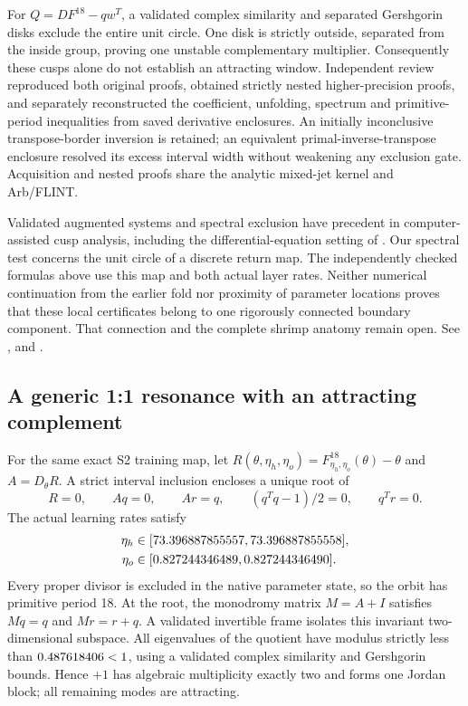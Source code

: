 \documentclass[11pt,letterpaper]{article}
\begin{document}
For $Q=DF^{18}-qw^T$, a validated complex similarity and separated Gershgorin
disks exclude the entire unit circle. One disk is strictly outside, separated
from the inside group, proving one unstable complementary multiplier.
Consequently these cusps alone do not establish an attracting window.
Independent review reproduced both original proofs, obtained strictly nested
higher-precision proofs, and separately reconstructed the coefficient,
unfolding, spectrum and primitive-period inequalities from saved derivative
enclosures. An initially inconclusive transpose-border inversion is retained;
an equivalent primal-inverse-transpose enclosure resolved its excess interval
width without weakening any exclusion gate. Acquisition and nested proofs
share the analytic mixed-jet kernel and Arb/FLINT.

Validated augmented systems and spectral exclusion have precedent in
computer-assisted cusp analysis, including the differential-equation setting
of \citet{lessardpugliese2025}. Our spectral test concerns the unit circle of
a discrete return map. The independently checked formulas above use this map
and both actual layer rates. Neither numerical continuation from the earlier
fold nor proximity of parameter locations proves that these local certificates
belong to one rigorously connected boundary component. That connection and
the complete shrimp anatomy remain open. See
,
 and
.

\subsection{A generic 1:1 resonance with an attracting complement}
\label{sec:double-one}

For the same exact S2 training map, let
$R(\theta,\eta_h,\eta_o)=F_{\eta_h,\eta_o}^{18}(\theta)-\theta$
and $A=D_\theta R$. A strict interval inclusion encloses a unique root of
\begin{equation}
R=0,\qquad Aq=0,\qquad Ar=q,\qquad
(q^Tq-1)/2=0,\qquad q^Tr=0.
\label{eq:double-one-chain}
\end{equation}
The actual learning rates satisfy
\begin{equation}
\begin{aligned}
\eta_h&\in[73.396887855557, 73.396887855558],\\
\eta_o&\in[0.827244346489, 0.827244346490].
\end{aligned}
\end{equation}
Every proper divisor is excluded in the native parameter state, so the orbit
has primitive period 18. At the root, the monodromy matrix $M=A+I$ satisfies
$Mq=q$ and $Mr=r+q$. A validated invertible frame isolates this invariant
two-dimensional subspace. All \nJordanComplement{} eigenvalues of the quotient
have modulus strictly less than $0.487618406<1$, using a validated
complex similarity and Gershgorin bounds. Hence $+1$ has algebraic multiplicity
exactly two and forms one Jordan block; all remaining modes are attracting.
\end{document}
